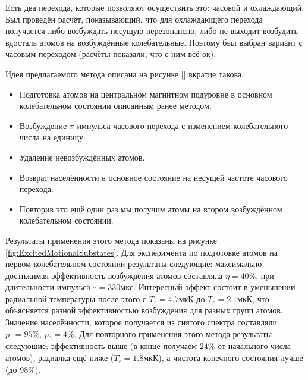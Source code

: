Есть два перехода, которые позволяют осуществить это: часовой и охлаждающий.
Был проведён расчёт, показывающий, что для охлаждающего перехода получается либо возбуждать несущую нерезонансно, либо не выходит возбудить вдосталь атомов на возбуждённые колебательные. 
Поэтому был выбран вариант с часовым переходом (расчёты показали, что с ним всё ок).

Идея предлагаемого метода описана на рисунке \ref{} вкратце такова:  
\begin{itemize}
	\item Подготовка атомов на центральном магнитном подуровне в основном колебательном состоянии описанным ранее методом.
	\item Возбуждение $\pi$-импульса часового перехода с изменением колебательного числа на единицу.
	\item Удаление невозбуждённых атомов.
	\item Возврат населённости в основное состояние на несущей частоте часового перехода.
	\item Повторив это ещё один раз мы получим атомы на втором возбуждённом колебательном состоянии. 
\end{itemize}

Результаты применения этого метода показаны на рисунке \ref{fig:ExcitedMotionalSubstates}.
Для эксперимента по подготовке атомов на первом колебательном состоянии результаты следующие: максимально достижимая эффективность возбуждения атомов составляла $\eta=40\%$, при длительности импульса $\tau=330\unit{мкс}$. 
Интересный эффект состоит в уменьшении радиальной температуры после этого с $T_r=4.7\unit{мкК}$ до $T_r=2.1\unit{мкК}$, что объясняется разной эффективностью возбуждения для разных групп атомов.
Значение населённости, которое получается из снятого спектра составляли $p_1 = 95\%$, $p_0 = 4\%$. 
Для повторного применения этого метода результаты следующие: эффективность выше (в конце получаем $24\%$ от начального числа атомов), радиалка ещё ниже ($T_r = 1.8\unit{мкК}$), а чистота конечного состояния лучше (до 98\%).


